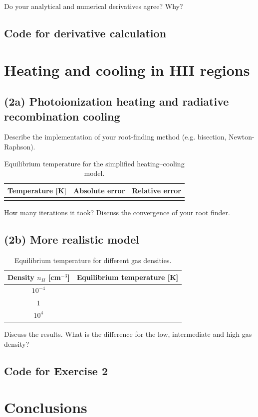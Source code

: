 \documentclass{article}
\newcommand{\CodeDir}{Code}
\newcommand{\CalcDir}{Calculations}
\begin{document}
Do your analytical and numerical derivatives agree? Why?

\subsection{Code for derivative calculation}



\section{Heating and cooling in HII regions}


\subsection{(2a) Photoionization heating and radiative recombination cooling}

Describe the implementation of your root-finding method (e.g. bisection, Newton-Raphson).

\begin{table}[H]
\centering
\caption{Equilibrium temperature for the simplified heating–cooling model.}
\begin{tabular}{|c|c|c|}
\hline
Temperature [K] & Absolute error & Relative error \\
\hline

\\
\hline
\end{tabular}
\end{table}

How many iterations it took? Discuss the convergence of your root finder.

\subsection{(2b) More realistic model}


\begin{table}[H]
\centering
\caption{Equilibrium temperature for different gas densities.}
\begin{tabular}{|c|c|}
\hline
Density \(n_H\) [cm\(^{-3}\)] & Equilibrium temperature [K] \\
\hline
$10^{-4}$ &  \\
$1$ &  \\
$10^4$ &  \\
\hline
\end{tabular}
\end{table}

Discuss the results.  What is the difference for the low, intermediate and high gas density?


\subsection{Code for Exercise 2}

 

\section{Conclusions}
\end{document}
